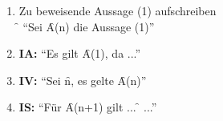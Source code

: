 \begin{enumerate}
    \item Zu beweisende Aussage (1) aufschreiben\\
    \f{\rightarrow} "`Sei \f{A(n)} die Aussage (1)"'
    \item \textbf{IA:} "`Es gilt \f{A(1)}, da ..."'
    \item \textbf{IV:} "`Sei \f{n\in {}}, es gelte \f{A(n)}"'
    \item \textbf{IS:} "`Für \f{A(n+1)} gilt ... \f{} ..."'
\end{enumerate}
